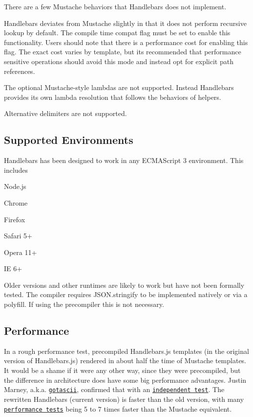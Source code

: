 There are a few Mustache behaviors that Handlebars does not implement.
\begin{DoxyItemize}
\item Handlebars deviates from Mustache slightly in that it does not perform recursive lookup by default. The compile time {\ttfamily compat} flag must be set to enable this functionality. Users should note that there is a performance cost for enabling this flag. The exact cost varies by template, but it\textquotesingle{}s recommended that performance sensitive operations should avoid this mode and instead opt for explicit path references.
\item The optional Mustache-\/style lambdas are not supported. Instead Handlebars provides its own lambda resolution that follows the behaviors of helpers.
\item Alternative delimiters are not supported.
\end{DoxyItemize}

\subsection*{Supported Environments }

Handlebars has been designed to work in any E\+C\+M\+A\+Script 3 environment. This includes


\begin{DoxyItemize}
\item Node.\+js
\item Chrome
\item Firefox
\item Safari 5+
\item Opera 11+
\item IE 6+
\end{DoxyItemize}

Older versions and other runtimes are likely to work but have not been formally tested. The compiler requires {\ttfamily J\+S\+O\+N.\+stringify} to be implemented natively or via a polyfill. If using the precompiler this is not necessary.

\href{https://saucelabs.com/u/handlebars}{\tt }

\subsection*{Performance }

In a rough performance test, precompiled Handlebars.\+js templates (in the original version of Handlebars.\+js) rendered in about half the time of Mustache templates. It would be a shame if it were any other way, since they were precompiled, but the difference in architecture does have some big performance advantages. Justin Marney, a.\+k.\+a. \href{http://github.com/gotascii}{\tt gotascii}, confirmed that with an \href{http://sorescode.com/2010/09/12/benchmarks.html}{\tt independent test}. The rewritten Handlebars (current version) is faster than the old version, with many \href{https://travis-ci.org/wycats/handlebars.js/builds/33392182#L538}{\tt performance tests} being 5 to 7 times faster than the Mustache equivalent.


